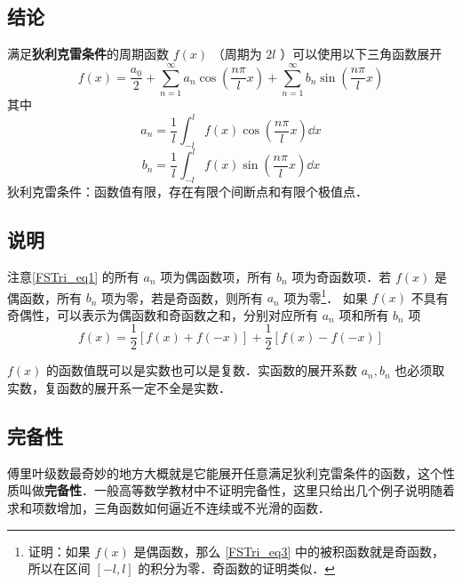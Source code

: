 



\subsection{结论}
满足\textbf{狄利克雷条件}的周期函数 $f(x)$ （周期为 $2l$ ）可以使用以下三角函数展开
\begin{equation}\label{FSTri_eq1}
f( x ) = \frac{a_0}{2} + \sum_{n = 1}^\infty a_n \cos (\frac{n\pi}{l}x) + \sum_{n = 1}^\infty b_n \sin (\frac{n\pi}{l}x)
\end{equation}
其中
\begin{equation}\label{FSTri_eq2}
{a_n} = \frac{1}{l}\int_{ - l}^l f( x )\cos (\frac{n\pi}{l}x) \dd{x} 
\end{equation}
\begin{equation}\label{FSTri_eq3}
{b_n} = \frac{1}{l}\int_{ - l}^l f( x )\sin (\frac{n\pi}{l}x) \dd{x}
\end{equation}
狄利克雷条件：函数值有限，存在有限个间断点和有限个极值点．

\subsection{说明}
注意\autoref{FSTri_eq1} 的所有 $a_n$ 项为偶函数项，所有 $b_n$ 项为奇函数项．若 $f(x)$ 是偶函数，所有 $b_n$ 项为零，若是奇函数，则所有 $a_n$ 项为零\footnote{证明：如果 $f(x)$ 是偶函数，那么 \autoref{FSTri_eq3} 中的被积函数就是奇函数，所以在区间 $[-l,l]$ 的积分为零．奇函数的证明类似．}． 如果 $f(x)$ 不具有奇偶性，可以表示为偶函数和奇函数之和，分别对应所有 $a_n$ 项和所有 $b_n$ 项
\begin{equation}
f(x) = \frac 12 [f(x)+f(-x)] + \frac 12 [f(x)-f(-x)]
\end{equation}

$f(x)$ 的函数值既可以是实数也可以是复数．实函数的展开系数 $a_n, b_n$ 也必须取实数，复函数的展开系一定不全是实数．

\subsection{完备性}
傅里叶级数最奇妙的地方大概就是它能展开任意满足狄利克雷条件的函数，这个性质叫做\textbf{完备性}．一般高等数学教材中不证明完备性，这里只给出几个例子说明随着求和项数增加，三角函数如何逼近不连续或不光滑的函数．

